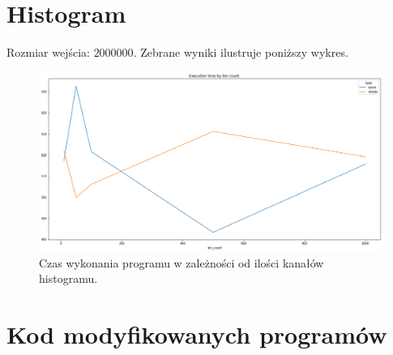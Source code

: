 \documentclass{article}
\begin{document}
    \section{Histogram}
    Rozmiar wejścia: $2000000$. Zebrane wyniki ilustruje poniższy wykres.
        \begin{figure}[htb]
            \centering
            \includegraphics[width=\textwidth]{cuda/Lab3/report/images/histo.png}
            \caption{Czas wykonania programu w zależności od ilości kanałów histogramu.}
        \end{figure}
        

    \clearpage
    \section{Kod modyfikowanych programów}
        
        
\end{document}
